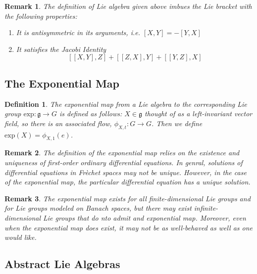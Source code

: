 \documentclass{article}
\newtheorem{defn}{Definition}
\newtheorem{rmk}{Remark}
\begin{document}
\begin{rmk}

The definition of Lie algebra given above imbues the Lie bracket with the following properties: 

\begin{enumerate}
	\item It is antisymmetric in its arguments, i.e. $[X,Y] = - [Y,X]$
	\item It satisfies the Jacobi Identity
		\[ [[X,Y],Z]+[[Z,X],Y]+[[Y,Z],X]	\]

\end{enumerate}
\end{rmk}


\subsection{The Exponential Map}


\begin{defn}

	The \textit{exponential map} from a Lie algebra to the corresponding Lie group $ \mathrm{exp}: \mathfrak{g} \to G$ is defined as follows: $X \in \mathfrak{g}$ thought of as a left-invariant vector field, so there is an associated flow, $\phi_{X,t}:G \to G$. Then we define $\mathrm{exp}(X) = \phi_{X,1}(e)$.

\end{defn}


\begin{rmk}

	The definition of the exponential map relies on the existence and uniqueness of first-order ordinary differential equations. In genral, solutions of differential equations in Fr\`echet spaces may not be unique. However, in the case of the exponential map, the particular differential equation has a unique solution.

\end{rmk}


\begin{rmk}

	The exponential map exists for all finite-dimensional Lie groups and for Lie groups modeled on Banach spaces, but there may exist infinite-dimensional Lie groups that do nto admit and exponential map. Moreover, even when the exponential map does exist, it may not be as well-behaved as well as one would like.

\end{rmk}

\subsection{Abstract Lie Algebras}
\end{document}
